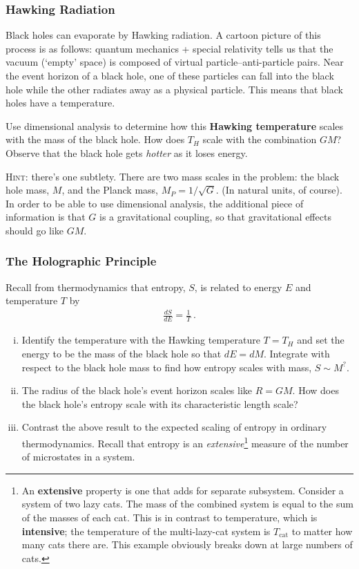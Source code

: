 \documentclass[12pt]{article}
\numberwithin{equation}{subsection}    %
\begin{document}
\subsubsection{Hawking Radiation}

Black holes can evaporate by Hawking radiation. A cartoon picture of this process is as follows: quantum mechanics + special relativity tells us that the vacuum (`empty' space) is composed of virtual particle--anti-particle pairs. Near the event horizon of a black hole, one of these particles can fall into the black hole while the other radiates away as a physical particle. This means that black holes have a temperature. 

Use dimensional analysis to determine how this \textbf{Hawking temperature} scales with the mass of the black hole. How does $T_H$ scale with the combination $GM$? Observe that the black hole gets \emph{hotter} as it loses energy.


\textsc{Hint}: there's one subtlety. There are two mass scales in the problem: the black hole mass, $M$, and the Planck mass, $M_P = 1/\sqrt{G}$. (In natural units, of course). In order to be able to use dimensional analysis, the additional piece of information is that $G$ is a gravitational coupling, so that gravitational effects should go like $GM$. 


\subsubsection{The Holographic Principle}

Recall from thermodynamics that entropy, $S$, is related to energy $E$ and temperature $T$ by
\begin{align}
	\frac{dS}{dE} = \frac{1}{T} \ .
\end{align}
\begin{enumerate}[(i)]
	\item Identify the temperature with the Hawking temperature $T=T_H$ and set the energy to be the mass of the black hole so that $dE = dM$. Integrate with respect to the black hole mass to find how entropy scales with mass, $S \sim M^?$.
	\item The radius of the black hole's event horizon scales like $R = GM$. How does the black hole's entropy scale with its characteristic length scale? 
	\item Contrast the above result to the expected scaling of entropy in ordinary thermodynamics. Recall that entropy is an \emph{extensive}\footnote{An \textbf{extensive} property is one that adds for separate subsystem. Consider a system of two lazy cats. The mass of the combined system is equal to the sum of the masses of each cat. This is in contrast to temperature, which is \textbf{intensive}; the temperature of the multi-lazy-cat system is $T_\text{cat}$ to matter how many cats there are. This example obviously breaks down at large numbers of cats.} measure of the number of microstates in a system.
\end{enumerate}
\end{document}
